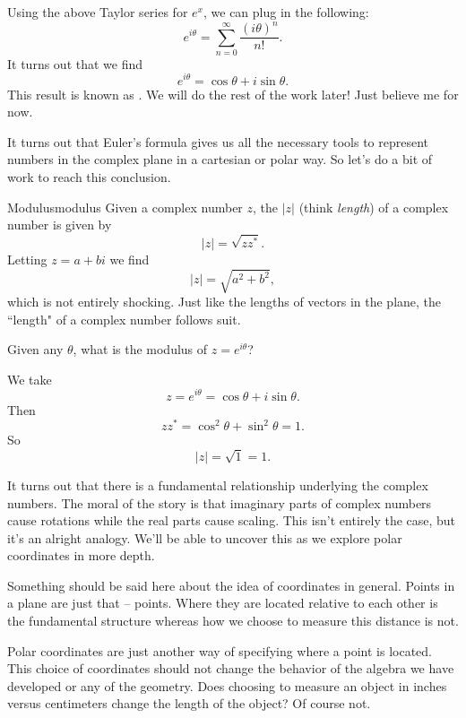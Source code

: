         Using the above Taylor series for $e^x$, we can plug in the following:
        \[
        e^{i\theta}=\sum_{n=0}^\infty \frac{(i\theta)^n}{n!}.
        \]
        It turns out that we find
        \[
        e^{i\theta} = \cos \theta + i \sin \theta.
        \]
        This result is known as . We will do the rest of the work later! Just believe me for now.
        
        It turns out that Euler's formula gives us all the necessary tools to represent numbers in the complex plane in a cartesian or polar way.  So let's do a bit of work to reach this conclusion.
        
        \begin{df}{Modulus}{modulus}
        Given a complex number $z$, the  $|z|$ (think \emph{length}) of a complex number is given by
        \[
        |z|=\sqrt{zz^*}.
        \]
        Letting $z=a+bi$ we find
        \[
        |z|=\sqrt{a^2+b^2},
        \]
        which is not entirely shocking.  Just like the lengths of vectors in the plane, the ``length" of a complex number follows suit.
        \end{df}
        
        \begin{question}
                Given any $\theta$, what is the modulus of $z=e^{i\theta}$?
        \end{question}
        
        \begin{answer}
        We take
        \[
        z=e^{i\theta}=\cos \theta + i \sin \theta.
        \]
        Then
        \[
        zz^*=\cos^2 \theta + \sin^2 \theta = 1.
        \]
        So
        \[
        |z|=\sqrt{1}=1.
        \]
        \end{answer}
        
        It turns out that there is a fundamental relationship underlying the complex numbers.  The moral of the story is that imaginary parts of complex numbers cause rotations while the real parts cause scaling. This isn't entirely the case, but it's an alright analogy. We'll be able to uncover this as we explore polar coordinates in more depth.
        
        \begin{remark}
        Something should be said here about the idea of coordinates in general.  Points in a plane are just that -- points.  Where they are located relative to each other is the fundamental structure whereas how we choose to measure this distance is not.  
        
        Polar coordinates are just another way of specifying where a point is located.  This choice of coordinates should not change the behavior of the algebra we have developed or any of the geometry.  Does choosing to measure an object in inches versus centimeters change the length of the object? Of course not.
        \end{remark}
        
